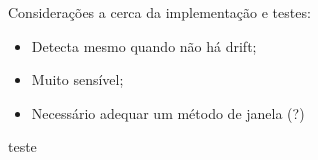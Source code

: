 \documentclass[qual, classic, a4paper]{ufbathesis}
\begin{document}
Considerações a cerca da implementação e testes:

\begin{itemize}
    \item Detecta mesmo quando não há drift;
    \item Muito sensível;
    \item Necessário adequar um método de janela (?)
\end{itemize}


teste

\backmatter




\end{document}

